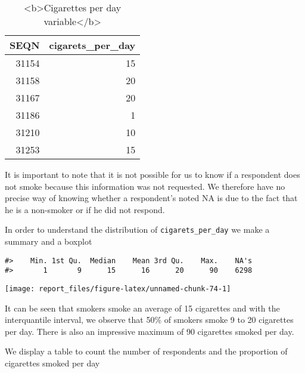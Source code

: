 \documentclass[
]{article}
\begin{document}
\begin{table}

\caption{\label{tab:unnamed-chunk-73}<b>Cigarettes per day variable</b>}
\centering
\begin{tabular}[t]{r|r}
\hline
SEQN & cigarets\_per\_day\\
\hline
31154 & 15\\
\hline
31158 & 20\\
\hline
31167 & 20\\
\hline
31186 & 1\\
\hline
31210 & 10\\
\hline
31253 & 15\\
\hline
\end{tabular}
\end{table}

It is important to note that it is not possible for us to know if a
respondent does not smoke because this information was not requested. We
therefore have no precise way of knowing whether a respondent's noted NA
is due to the fact that he is a non-smoker or if he did not respond.

In order to understand the distribution of \texttt{cigarets\_per\_day}
we make a summary and a boxplot

\begin{verbatim}
#>    Min. 1st Qu.  Median    Mean 3rd Qu.    Max.    NA's 
#>       1       9      15      16      20      90    6298
\end{verbatim}

\begin{center}\texttt{[image: report\_files/figure-latex/unnamed-chunk-74-1]} \end{center}

It can be seen that smokers smoke an average of 15 cigarettes and with
the interquantile interval, we observe that 50\% of smokers smoke 9 to
20 cigarettes per day. There is also an impressive maximum of 90
cigarettes smoked per day.

We display a table to count the number of respondents and the proportion
of cigarettes smoked per day
\end{document}
